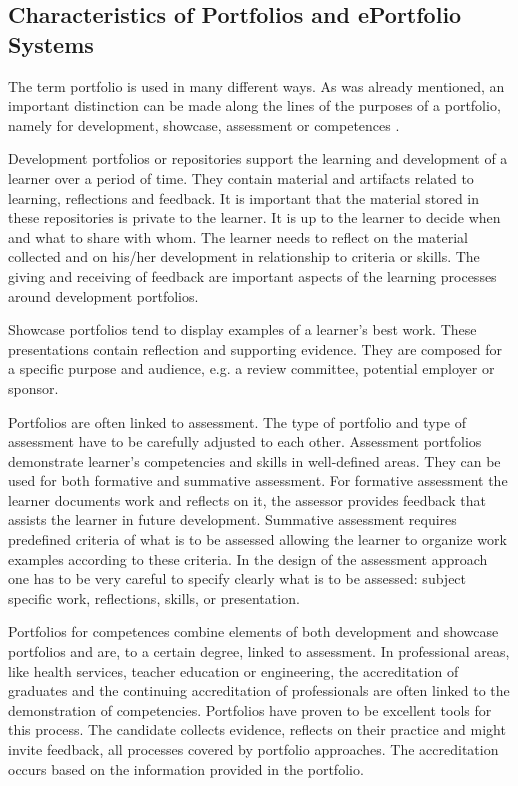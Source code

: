 \subsection{Characteristics of Portfolios and ePortfolio Systems}
\label{sec:charep}
The term portfolio is used in many different ways. As was already mentioned, an
important distinction can be made along the lines of the purposes of a
portfolio, namely for development, showcase, assessment or competences
\citep{VanTartwijkJ.2004}.

Development portfolios or repositories support the learning and development of a
learner over a period of time. They contain material and artifacts related to
learning, reflections and feedback. It is important that the material stored in
these repositories is private to the learner. It is up to the learner to decide
when and what to share with whom. The learner needs to reflect on the material
collected and on his/her development in relationship to criteria or skills. The
giving and receiving of feedback are important aspects of the learning processes
around development portfolios.

Showcase portfolios tend to display examples of a learner's best work. These
presentations contain reflection and supporting evidence. They are composed for
a specific purpose and audience, e.g. a review committee, potential employer or
sponsor.

Portfolios are often linked to assessment. The type of portfolio and type of
assessment have to be carefully adjusted to each other. Assessment portfolios
demonstrate learner's competencies and skills in well-defined areas. They can be
used for both formative and summative assessment. For formative assessment the
learner documents work and reflects on it, the assessor provides feedback that
assists the learner in future development. Summative assessment requires
predefined criteria of what is to be assessed allowing the learner to organize
work examples according to these criteria. In the design of the assessment
approach one has to be very careful to specify clearly what is to be assessed:
subject specific work, reflections, \LLLs skills, or presentation.

Portfolios for competences combine elements of both development and showcase
portfolios and are, to a certain degree, linked to assessment. In professional
areas, like health services, teacher education or engineering, the accreditation
of graduates and the continuing accreditation of professionals are often linked
to the demonstration of competencies. Portfolios have proven to be excellent
tools for this process. The candidate collects evidence, reflects on their
practice and might invite feedback, all processes covered by portfolio
approaches. The accreditation occurs based on the information provided in the
portfolio.

